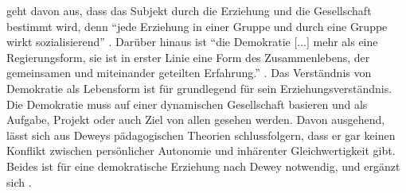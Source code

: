 \citeauthor{Dewey2010} geht davon aus, dass das Subjekt durch die Erziehung und die Gesellschaft bestimmt wird, denn ``jede Erziehung in einer Gruppe und durch eine Gruppe wirkt sozialisierend'' \parencite[115]{Dewey2010}.
Darüber hinaus ist ``die Demokratie [...] mehr als eine Regierungsform, sie ist in erster Linie eine Form des Zusammenlebens, der gemeinsamen und miteinander geteilten Erfahrung.'' \parencite[121]{Dewey2010}.
Das Verständnis von Demokratie als Lebensform ist für \citeauthor{Dewey2010} grundlegend für sein Erziehungsverständnis.
Die Demokratie muss auf einer dynamischen Gesellschaft basieren und als Aufgabe, Projekt oder auch Ziel von allen gesehen werden.
Davon ausgehend, lässt sich aus Deweys pädagogischen Theorien schlussfolgern, dass er gar keinen Konflikt zwischen persönlicher Autonomie und inhärenter Gleichwertigkeit gibt.
Beides ist für eine demokratische Erziehung nach Dewey notwendig, und ergänzt sich \parencite[121]{Dewey2010}.
